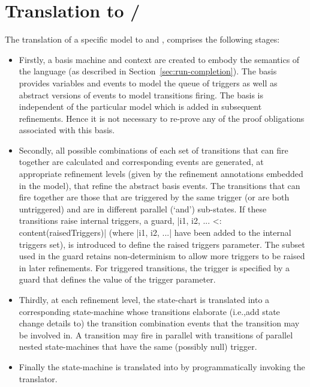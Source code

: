 
\section{\SCXML Translation to \UMLB/\EventB}
\label{sec:translation}

The translation of a specific \SCXML model to \UMLB and  \EventB, comprises the following stages: 
\begin{itemize}
	\item 
Firstly, a basis machine and context are created to embody the semantics of the \SCXML language (as described in Section~\ref{sec:run-completion}).
The basis provides variables and events to model the queue of triggers as well as abstract versions of events to model transitions firing.
The basis is independent of the particular \SCXML model which is added in subsequent refinements.
Hence it is not necessary to re-prove any of the proof obligations associated with this basis.
	\item 
Secondly, all possible combinations of each set of transitions that can fire together are calculated and corresponding events are generated, at appropriate refinement levels (given by the refinement annotations embedded in the \SCXML model), that refine the abstract basis events.
The transitions that can fire together are those that are triggered by the same trigger (or are both untriggered) and are in different parallel (`and') sub-states.
If these transitions raise internal triggers, a guard, |{i1, i2, ...} <: content(raisedTriggers)| (where |i1, i2, ...| have been added to the internal triggers set), is introduced to define the raised triggers parameter. 
The subset used in the guard retains non-determinism to allow more triggers to be raised in later refinements.
For triggered transitions, the trigger is specified by a guard that defines the value of the trigger parameter. 
	\item 
Thirdly, at each refinement level, the \SCXML state-chart is translated into a corresponding \UMLB state-machine whose transitions elaborate (i.e.,add state change details to) the transition combination events that the transition may be involved in.
A transition may fire in parallel with transitions of parallel nested state-machines that have the same (possibly null) trigger.
	\item
Finally the \UMLB state-machine is translated into \EVENTB by programmatically invoking the \UMLB translator.
\end{itemize}

